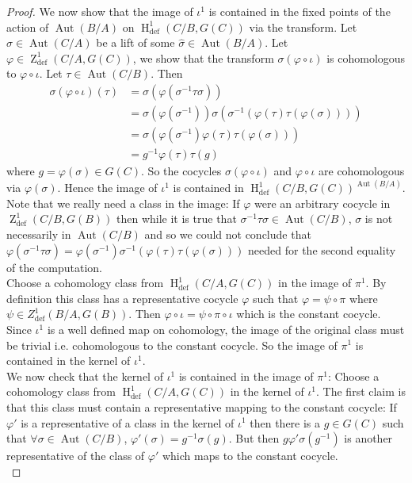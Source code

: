 \documentclass{article}
\theoremstyle{problemstyle}
\DeclareMathOperator{\defin}{def} %
\DeclareMathOperator{\aut}{Aut} %
\DeclareMathOperator{\HH}{H} %
\DeclareMathOperator{\ZZ}{Z} %
\begin{document}
\begin{proof}
We now show that the image of $\iota^1$ is contained in the fixed points of the action of $\aut(B/A)$ on $\HH^1_{\defin}(C/B,G(C))$ via the transform. Let $\sigma \in \aut(C/A)$ be a lift of some $\hat{\sigma} \in \aut(B/A)$. Let $\varphi \in \ZZ^1_{\defin}(C/A,G(C))$, we show that the transform $\sigma(\varphi\circ\iota)$ is cohomologous to $\varphi\circ\iota$. Let $\tau \in \aut(C/B)$. Then
\begin{align*}
    \sigma(\varphi\circ\iota)(\tau) &= \sigma(\varphi(\sigma^{-1}\tau\sigma))\\
    &= \sigma(\varphi(\sigma^{-1}))\sigma(\sigma^{-1}(\varphi(\tau)\tau(\varphi(\sigma))))\\
    &= \sigma(\varphi(\sigma^{-1})\varphi(\tau)\tau(\varphi(\sigma)))\\
    &= g^{-1}\varphi(\tau)\tau(g)
\end{align*}
where $g = \varphi(\sigma) \in G(C)$. So the cocycles $\sigma(\varphi\circ\iota)$ and $\varphi\circ\iota$ are cohomologous via $\varphi(\sigma)$. Hence the image of $\iota^1$ is contained in $\HH^1_{\defin}(C/B,G(C))^{\aut(B/A)}$. Note that we really need a class in the image: If $\varphi$ were an arbitrary cocycle in $\ZZ^1_{\defin}(C/B,G(B))$ then while it is true that $\sigma^{-1}\tau\sigma \in \aut(C/B)$, $\sigma$ is not necessarily in $\aut(C/B)$ and so we could not conclude that $\varphi(\sigma^{-1}\tau\sigma) = \varphi(\sigma^{-1})\sigma^{-1}(\varphi(\tau)\tau(\varphi(\sigma)))$ needed for the second equality of the computation.\\

Choose a cohomology class from $\HH^1_{\defin}(C/A,G(C))$ in the image of $\pi^1$. By definition this class has a representative cocycle $\varphi$ such that $\varphi = \psi \circ \pi$ where $\psi \in Z^1_{\defin}(B/A,G(B))$. Then $\varphi\circ \iota = \psi \circ \pi\circ \iota$ which is the constant cocycle. Since $\iota^1$ is a well defined map on cohomology, the image of the original class must be trivial i.e. cohomologous to the constant cocycle. So the image of $\pi^1$ is contained in the kernel of $\iota^1$. \\

We now check that the kernel of $\iota^1$ is contained in the image of $\pi^1$: Choose a cohomology class from $\HH^1_{\defin}(C/A,G(C))$ in the kernel of $\iota^1$. The first claim is that this class must contain a representative mapping to the constant cocycle: If $\varphi'$ is a representative of a class in the kernel of $\iota^1$ then there is a $g \in G(C)$ such that $\forall \sigma \in \aut(C/B)$, $\varphi'(\sigma) = g^{-1}\sigma(g)$. But then $g\varphi'\sigma(g^{-1})$ is another representative of the class of $\varphi'$ which maps to the constant cocycle.\\


\end{proof}
\end{document}
